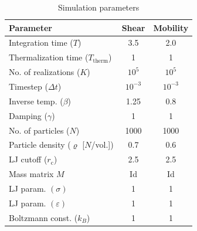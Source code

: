 \documentclass[11pt]{article}
\theoremstyle{definition}
\begin{document}
\begin{table}[h!]
\centering
\begin{tabular}{lcc}
	\toprule
	\bf{Parameter} & {\bf Shear} & {\bf Mobility} \\
	\midrule
Integration time ($T$) & 3.5 & 2.0 \\
    Thermalization time ($T_\mathrm{therm}$) & 1 & 1 \\
	No. of realizations ($K$) & $10^5$ & $10^5$ \\
	Timestep ($\Delta t$) & $10^{-3}$ & $10^{-3}$ \\
	Inverse temp. ($\beta$) & 1.25 & 0.8 \\
	Damping ($\gamma$) & 1 & 1 \\
	No. of particles ($N$) & 1000 & 1000 \\
	Particle density ($\varrho$ [$N$/vol.]) & 0.7 & 0.6 \\
	LJ cutoff ($r_\mathrm{c}$) & 2.5 & 2.5 \\
	Mass matrix $M$ & {\rm Id} & {\rm Id} \\
	LJ param. $(\sigma)$ & 1 & 1 \\
	LJ param. $(\varepsilon)$ & 1 & 1 \\
	Boltzmann const. ($k_B$) & 1 & 1 \\
	\bottomrule
\end{tabular}
\caption{Simulation parameters}\label{table:sim_params}%
\end{table}
\end{document}
